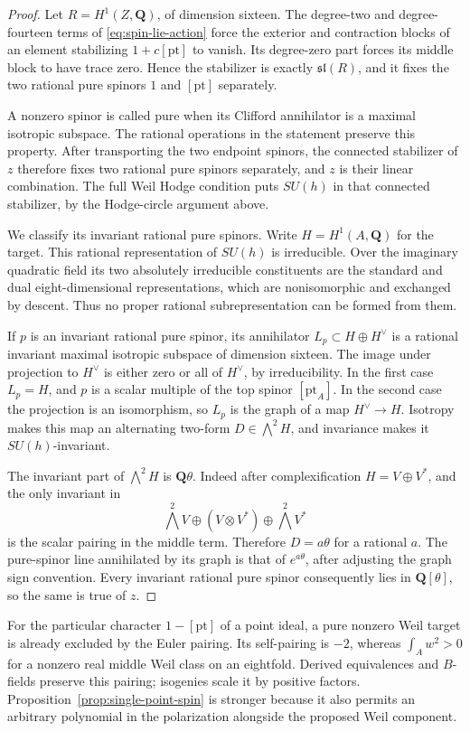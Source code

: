 \documentclass[11pt]{article}
\theoremstyle{definition}
\theoremstyle{remark}
\newcommand{\Q}{\mathbf Q}
\begin{document}
\begin{proof}
Let $R=H^1(Z,\Q)$, of dimension sixteen. The degree-two and degree-fourteen terms of \eqref{eq:spin-lie-action} force the exterior and contraction blocks of an element stabilizing $1+c[\mathrm{pt}]$ to vanish. Its degree-zero part forces its middle block to have trace zero. Hence the stabilizer is exactly $\mathfrak{sl}(R)$, and it fixes the two rational pure spinors $1$ and $[\mathrm{pt}]$ separately.

A nonzero spinor is called pure when its Clifford annihilator is a maximal isotropic subspace. The rational operations in the statement preserve this property. After transporting the two endpoint spinors, the connected stabilizer of $z$ therefore fixes two rational pure spinors separately, and $z$ is their linear combination. The full Weil Hodge condition puts $SU(h)$ in that connected stabilizer, by the Hodge-circle argument above.

We classify its invariant rational pure spinors. Write $H=H^1(A,\Q)$ for the target. This rational representation of $SU(h)$ is irreducible. Over the imaginary quadratic field its two absolutely irreducible constituents are the standard and dual eight-dimensional representations, which are nonisomorphic and exchanged by descent. Thus no proper rational subrepresentation can be formed from them.

If $p$ is an invariant rational pure spinor, its annihilator $L_p\subset H\oplus H^\vee$ is a rational invariant maximal isotropic subspace of dimension sixteen. The image under projection to $H^\vee$ is either zero or all of $H^\vee$, by irreducibility. In the first case $L_p=H$, and $p$ is a scalar multiple of the top spinor $[\mathrm{pt}_A]$. In the second case the projection is an isomorphism, so $L_p$ is the graph of a map $H^\vee\to H$. Isotropy makes this map an alternating two-form $D\in\bigwedge^2H$, and invariance makes it $SU(h)$-invariant.

The invariant part of $\bigwedge^2H$ is $\Q\theta$. Indeed after complexification $H=V\oplus V^*$, and the only invariant in
\[
 \bigwedge^2V\oplus(V\otimes V^*)\oplus\bigwedge^2V^*
\]
is the scalar pairing in the middle term. Therefore $D=a\theta$ for a rational $a$. The pure-spinor line annihilated by its graph is that of $e^{a\theta}$, after adjusting the graph sign convention. Every invariant rational pure spinor consequently lies in $\Q[\theta]$, so the same is true of $z$.
\end{proof}

For the particular character $1-[\mathrm{pt}]$ of a point ideal, a pure nonzero Weil target is already excluded by the Euler pairing. Its self-pairing is $-2$, whereas $\int_Aw^2>0$ for a nonzero real middle Weil class on an eightfold. Derived equivalences and $B$-fields preserve this pairing; isogenies scale it by positive factors. Proposition~\ref{prop:single-point-spin} is stronger because it also permits an arbitrary polynomial in the polarization alongside the proposed Weil component.
\end{document}

